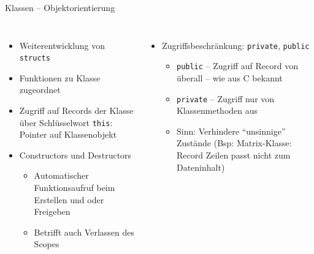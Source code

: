 \begin{frame}{Klassen -- Objektorientierung}
%
\begin{columns}[T]
\begin{itemize}
\item Weiterentwicklung von \texttt{structs}
\item Funktionen zu Klasse zugeordnet
\item Zugriff auf Records der Klasse über Schlüsselwort \texttt{this}: Pointer auf Klassenobjekt
\item Constructors und Destructors
	\begin{itemize}
	\item Automatischer Funktionsaufruf beim Erstellen und oder Freigeben
	\item Betrifft auch Verlassen des Scopes
	\end{itemize}
\end{itemize}
%
\begin{itemize}
\item Zugriffsbeschränkung: \texttt{private}, \texttt{public}
	\begin{itemize}
	\item \texttt{public} -- Zugriff auf Record von überall -- wie aus C bekannt
	\item \texttt{private} -- Zugriff nur von Klassenmethoden aus
	\item Sinn: Verhindere \enquote{unsinnige} Zustände (Bsp: Matrix-Klasse: Record Zeilen passt nicht 
		zum  Dateninhalt)
	\end{itemize}
\end{itemize}
\end{columns}
%
\end{frame}


